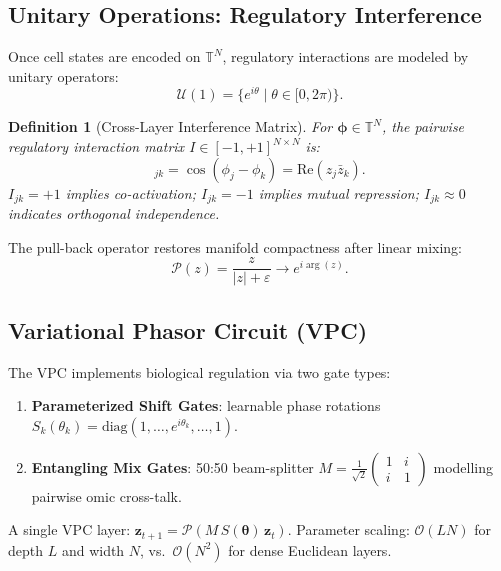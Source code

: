 \documentclass[preprint,12pt,amsmath,amssymb,superscriptaddress,floatfix]{revtex4-2}
\newtheorem{definition}{Definition}[section]
\newcommand{\torus}{\mathbb{T}}
\begin{document}
\subsection{Unitary Operations: Regulatory Interference}
\label{subsec:unitary}

Once cell states are encoded on $\torus^N$, regulatory interactions are
modeled by unitary operators:
\begin{equation}
    \mathcal{U}(1) = \bigl\{e^{i\theta} \mid \theta \in [0,2\pi)\bigr\}.
\end{equation}

\begin{definition}[Cross-Layer Interference Matrix]
\label{def:interference}
For $\boldsymbol{\phi} \in \torus^N$, the pairwise regulatory interaction
matrix $I \in [-1,+1]^{N \times N}$ is:
\begin{equation}
    [I]_{jk} = \cos(\phi_j - \phi_k) = \mathrm{Re}(z_j\bar{z}_k).
\end{equation}
$I_{jk} = +1$ implies co-activation; $I_{jk} = -1$ implies mutual repression;
$I_{jk} \approx 0$ indicates orthogonal independence.
\end{definition}

The pull-back operator restores manifold compactness after linear mixing:
\begin{equation}
    \mathcal{P}(z) = \frac{z}{|z| + \varepsilon} \longrightarrow e^{i\arg(z)}.
\end{equation}

\subsection{Variational Phasor Circuit (VPC)}
\label{subsec:vpc}

The VPC implements
biological regulation via two gate types:
\begin{enumerate}
    \item \textbf{Parameterized Shift Gates}: learnable phase rotations
    $S_k(\theta_k) = \mathrm{diag}(1,\ldots,e^{i\theta_k},\ldots,1)$.
    \item \textbf{Entangling Mix Gates}: 50:50 beam-splitter
    $M = \frac{1}{\sqrt{2}}\begin{pmatrix}1 & i\\i&1\end{pmatrix}$
    modelling pairwise omic cross-talk.
\end{enumerate}
A single VPC layer: $\boldsymbol{z}_{t+1} = \mathcal{P}(M\,S(\boldsymbol{\theta})\,\boldsymbol{z}_t)$.
Parameter scaling: $\mathcal{O}(LN)$ for depth $L$ and width $N$,
vs.\ $\mathcal{O}(N^2)$ for dense Euclidean layers.
\end{document}
